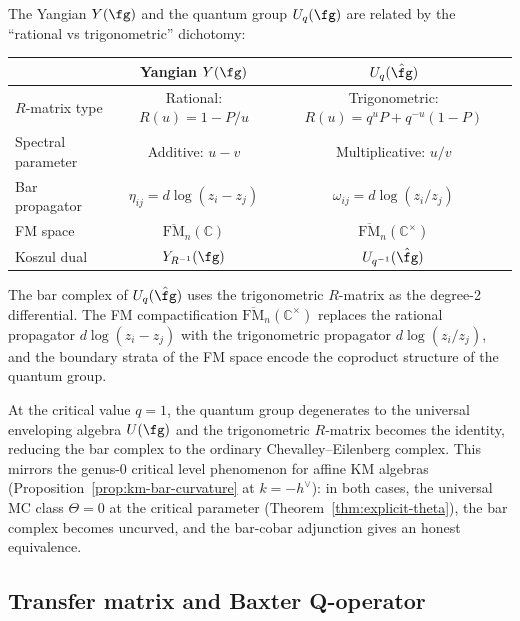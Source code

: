 \begin{remark}
\label{rem:yangian-quantum-group}

The Yangian $Y(\fg)$ and the quantum group $U_q(\fg)$ are
related by the ``rational vs trigonometric'' dichotomy:
\begin{center}
\renewcommand{\arraystretch}{1.2}
\begin{tabular}{l|cc}
& \textbf{Yangian $Y(\fg)$} & \textbf{$U_q(\hat{\fg})$} \\
\hline
$R$-matrix type & Rational: $R(u) = 1 - P/u$ &
Trigonometric: $R(u) = q^{u} P + q^{-u}(1-P)$ \\
Spectral parameter & Additive: $u - v$ & Multiplicative: $u/v$ \\
Bar propagator & $\eta_{ij} = d\log(z_i - z_j)$ &
$\omega_{ij} = d\log(z_i/z_j)$ \\
FM space & $\overline{\mathrm{FM}}_n(\mathbb{C})$ &
$\overline{\mathrm{FM}}_n(\mathbb{C}^\times)$ \\
Koszul dual & $Y_{R^{-1}}(\fg)$ & $U_{q^{-1}}(\hat{\fg})$
\end{tabular}
\end{center}

The bar complex of $U_q(\hat{\fg})$ uses the trigonometric
$R$-matrix as the degree-2 differential.  The FM compactification
$\overline{\mathrm{FM}}_n(\mathbb{C}^\times)$ replaces the
rational propagator $d\log(z_i - z_j)$ with the trigonometric
propagator $d\log(z_i/z_j)$, and the boundary strata of the
FM space encode the coproduct structure of the quantum group.

At the critical value $q = 1$, the quantum group degenerates to
the universal enveloping algebra $U(\fg)$ and the trigonometric
$R$-matrix becomes the identity, reducing the bar complex to
the ordinary Chevalley--Eilenberg complex.  This mirrors the
genus-0 critical level phenomenon for affine KM algebras
(Proposition~\ref{prop:km-bar-curvature} at $k = -h^\vee$):
in both cases, the universal MC class $\Theta = 0$ at the
critical parameter (Theorem~\ref{thm:explicit-theta}), the bar
complex becomes uncurved, and the bar-cobar adjunction gives
an honest equivalence.
\end{remark}


\subsection{Transfer matrix and Baxter Q-operator}

